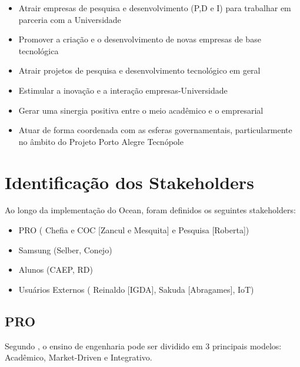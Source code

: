 \begin{itemize}
\item Atrair empresas de pesquisa e desenvolvimento (P,D e I) para trabalhar em parceria com a Universidade
\item Promover a criação e o desenvolvimento de novas empresas de base tecnológica
\item Atrair projetos de pesquisa e desenvolvimento tecnológico em geral
\item Estimular a inovação e a interação empresas-Universidade
\item Gerar uma sinergia positiva entre o meio acadêmico e o empresarial
\item Atuar de forma coordenada com as esferas governamentais, particularmente no âmbito do Projeto Porto Alegre Tecnópole
\end{itemize}

\section{Identificação dos Stakeholders}
\label{sec:identificacao_stakeholders}

Ao longo da implementação do Ocean, foram definidos os seguintes stakeholders:

\begin{itemize}
\item PRO ( Chefia e COC [Zancul e Mesquita] e Pesquisa [Roberta])
\item Samsung (Selber, Conejo)
\item Alunos (CAEP, RD)
\item Usuários Externos ( Reinaldo [IGDA], Sakuda [Abragames], IoT)
\end{itemize}

\subsection{PRO}
\label{sec:con_pro}

Segundo , o ensino de engenharia pode ser dividido em 3 principais modelos: Acadêmico, Market-Driven e Integrativo.

